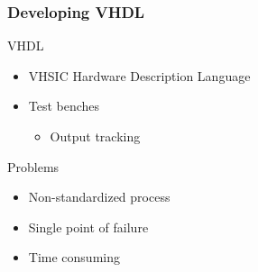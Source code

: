 \documentclass[british,10pt]{beamer}
\begin{document}
%

\begin{frame}\frametitle{Developing VHDL}
VHDL
\begin{itemize}
\item VHSIC Hardware Description Language
\item Test benches
\begin{itemize}
\item Output tracking
\end{itemize}
\end{itemize}
\vskip5pt
Problems
\begin{itemize}
\item Non-standardized process
\item Single point of failure
\item Time consuming
\end{itemize}
\end{frame}
\end{document}
